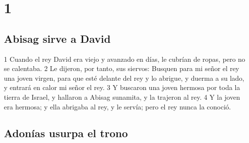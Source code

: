 
\chapter{1}

\section*{Abisag sirve a David}

1 Cuando el rey David era viejo y avanzado en días, le cubrían de ropas, pero no se calentaba.
2 Le dijeron, por tanto, sus siervos: Busquen para mi señor el rey una joven virgen, para que esté delante del rey y lo abrigue, y duerma a su lado, y entrará en calor mi señor el rey.
3 Y buscaron una joven hermosa por toda la tierra de Israel, y hallaron a Abisag sunamita, y la trajeron al rey.
4 Y la joven era hermosa; y ella abrigaba al rey, y le servía; pero el rey nunca la conoció.
\section*{Adonías usurpa el trono}

